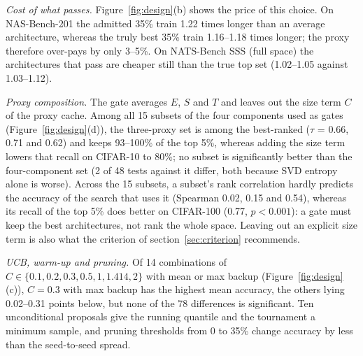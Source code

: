 \documentclass{sadhana}
\begin{document}
\textit{Cost of what passes.} Figure~\ref{fig:design}(b) shows the price of this choice. On NAS-Bench-201 the admitted 35\% train 1.22 times longer than an average architecture, whereas the truly best 35\% train 1.16--1.18 times longer; the proxy therefore over-pays by only 3--5\%. On NATS-Bench SSS (full space) the architectures that pass are cheaper still than the true top set (1.02--1.05 against 1.03--1.12).

\textit{Proxy composition.} The gate averages $E$, $S$ and $T$ and leaves out the size term $C$ of the proxy cache. Among all 15 subsets of the four components used as gates (Figure~\ref{fig:design}(d)), the three-proxy set is among the best-ranked ($\tau$ = 0.66, 0.71 and 0.62) and keeps 93--100\% of the top 5\%, whereas adding the size term lowers that recall on CIFAR-10 to 80\%; no subset is significantly better than the four-component set (2 of 48 tests against it differ, both because SVD entropy alone is worse). Across the 15 subsets, a subset's rank correlation hardly predicts the accuracy of the search that uses it (Spearman 0.02, 0.15 and 0.54), whereas its recall of the top 5\% does better on CIFAR-100 (0.77, $p<0.001$): a gate must keep the best architectures, not rank the whole space. Leaving out an explicit size term is also what the criterion of section~\ref{sec:criterion} recommends.

\textit{UCB, warm-up and pruning.} Of 14 combinations of $C\in\{0.1,0.2,0.3,0.5,1,1.414,2\}$ with mean or max backup (Figure~\ref{fig:design}(c)), $C=0.3$ with max backup has the highest mean accuracy, the others lying 0.02--0.31 points below, but none of the 78 differences is significant. Ten unconditional proposals give the running quantile and the tournament a minimum sample, and pruning thresholds from 0 to 35\% change accuracy by less than the seed-to-seed spread.
\end{document}

